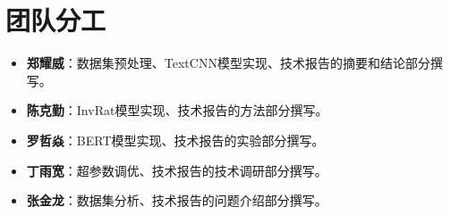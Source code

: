 \section*{团队分工}

\begin{itemize}
    \item {\bf 郑耀威}：数据集预处理、TextCNN模型实现、技术报告的摘要和结论部分撰写。
    \item {\bf 陈克勤}：InvRat模型实现、技术报告的方法部分撰写。
    \item {\bf 罗哲焱}：BERT模型实现、技术报告的实验部分撰写。
    \item {\bf 丁雨宽}：超参数调优、技术报告的技术调研部分撰写。
    \item {\bf 张金龙}：数据集分析、技术报告的问题介绍部分撰写。
\end{itemize}
